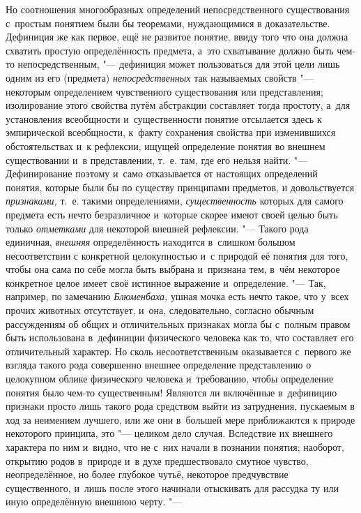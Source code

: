 Но соотношения многообразных определений непосредственного
существования с~простым понятием были бы теоремами, нуждающимися в
доказательстве. Дефиниция же как первое, ещё не развитое понятие, ввиду
того что она должна схватить простую определённость предмета, а~это
схватывание должно быть чем-то непосредственным, "--- дефиниция
может пользоваться для этой цели лишь одним из его (предмета)
{\em непосредственных}
так называемых свойств "--- некоторым
определением чувственного существования или представления; изолирование
этого свойства путём абстракции составляет тогда простоту, а~для
установления всеобщности и~существенности понятие отсылается здесь к
эмпирической всеобщности, к~факту сохранения свойства при изменившихся
обстоятельствах и~к рефлексии, ищущей определение понятия во внешнем
существовании и~в представлении, т.~е. там, где его нельзя найти. "---
Дефинирование поэтому и~само отказывается от настоящих
определений понятия, которые были бы по существу принципами предметов, и
довольствуется {\em признаками,}
т.~е. такими определениями,
{\em существенность}
которых для самого предмета есть нечто безразличное и~которые
скорее имеют своей целью быть только
{\em отметками} для
некоторой внешней рефлексии. "--- Такого рода единичная,
{\em внешняя}
определённость находится в~слишком большом несоответствии с
конкретной целокупностью и~с природой её понятия для того, чтобы она сама
по себе могла быть выбрана и~признана тем, в~чём некоторое конкретное целое
имеет своё истинное выражение и~определение. "--- Так,
например, по замечанию
{\em Блюменбаха,} ушная
мочка есть нечто такое, что у~всех прочих животных отсутствует, и~она,
следовательно, согласно обычным рассуждениям об общих и
отличительных признаках могла бы с~полным правом быть
использована в~дефиниции физического человека как то, что составляет его
отличительный характер. Но сколь несоответственным оказывается с~первого же
взгляда такого рода совершенно внешнее определение представлению о
целокупном облике физического человека и~требованию, чтобы определение
понятия было чем-то существенным! Являются ли включённые в~дефиницию
признаки просто лишь такого рода средством выйти из затруднения, пускаемым
в ход за неимением лучшего, или же они в~большей мере приближаются к
природе некоторого принципа, это "--- целиком дело случая.
Вследствие их внешнего характера по ним и~видно, что не с~них начали в
познании понятия; наоборот, открытию родов в~природе и~в духе
предшествовало смутное чувство, неопределённое, но более глубокое чутьё,
некоторое предчувствие существенного, и~лишь после этого начинали
отыскивать для рассудка ту или иную определённую внешнюю черту. "---
